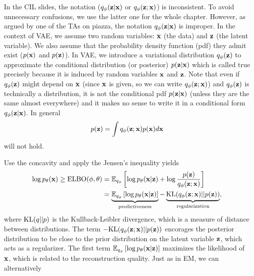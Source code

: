 \documentclass[../main.tex]{subfiles}
\begin{document}
\begin{remark}
	In the CIL slides, the notation ($q_\phi({\bf z}|{\bf x})$ or $q_\phi({\bf z};{\bf x})$) is inconsistent. To avoid unnecessary confusions, we use the latter one for the whole chapter. However, as argued by one of the TAs on piazza, the notation $q_\phi({\bf z}|{\bf x})$ is improper. In the context of VAE, we assume two random variables: ${\bf x}$ (the data) and ${\bf z}$ (the latent variable). We also assume that the probability density function (pdf) they admit exist ($p({\bf x})$ and $p({\bf z})$). In VAE, we introduce a variational distribution $q_\phi({\bf z})$ to approximate the conditional distribution (or posterior) $p({\bf z}|{\bf x})$ which is called true precisely because it is induced by random variables ${\bf x}$ and ${\bf z}$. Note that even if $q_\phi({\bf z})$ might depend on ${\bf x}$ (since ${\bf x}$ is given, so we can write $q_\phi({\bf z};{\bf x})$) and $q_\phi({\bf z})$ is technically a distribution, it is not the conditional pdf $p({\bf z}|{\bf x})$ (unless they are the same almost everywhere) and it makes no sense to write it in a conditional form $q_\phi({\bf z}|{\bf x})$. In general
	\begin{equation*}
		p({\bf z}) = \int q_\phi({\bf z};{\bf x})p({\bf x})d{\bf x}
	\end{equation*}
	will not hold.
\end{remark}
Use the concavity and apply the Jensen's inequality yields
\begin{align*}
\log p_{\theta}({\bf x})\geq {\rm ELBO}(\phi, \theta)&=\mathbb{E}_{q_{\phi}}\left[\log p_{\theta}({\bf x}|{\bf z}) + \log \frac{p({\bf z})}{q_{\phi}({\bf z};{\bf x})} \right]\\
&=\underbrace{\mathbb{E}_{q_{\phi}}\left[\log p_{\theta}({\bf x}|{\bf z})\right]}_{\rm predictiveness} - \underbrace{{\rm KL}(q_{\phi}({\bf z};{\bf x})||p({\bf z}))}_{\rm regularization},
\end{align*}
where ${\rm KL}(q||p)$ is the Kullback-Leibler divergence, which is a measure of distance between distributions. The term $-{\rm KL}(q_{\phi}({\bf z};{\bf x})||p({\bf z}))$ encorages the posterior distribution to be close to the prior distribution on the latent variable ${\bf z}$, which acts as a regularizer. The first term $\mathbb{E}_{q_{\phi}}\left[\log p_{\theta}({\bf x}|{\bf z})\right]$ maximizes the likelihood of ${\bf x}$, which is related to the reconstruction quality. Just as in EM, we can alternatively
\end{document}

